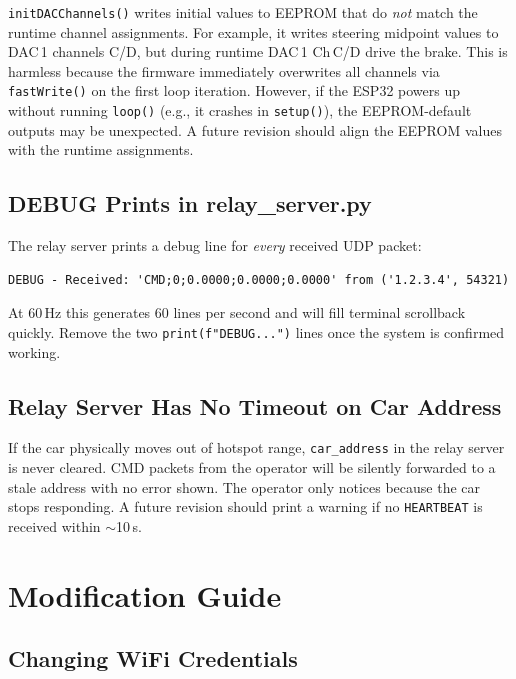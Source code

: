 \documentclass[12pt, letterpaper]{article}
\begin{document}
\texttt{initDACChannels()} writes initial values to EEPROM that do \emph{not}
match the runtime channel assignments.  For example, it writes steering midpoint
values to DAC\,1 channels C/D, but during runtime DAC\,1 Ch\,C/D drive the
brake.  This is harmless because the firmware immediately overwrites all channels
via \texttt{fastWrite()} on the first loop iteration.  However, if the ESP32
powers up without running \texttt{loop()} (e.g., it crashes in \texttt{setup()}),
the EEPROM-default outputs may be unexpected.  A future revision should align the
EEPROM values with the runtime assignments.

\subsection{DEBUG Prints in relay\_server.py}

The relay server prints a debug line for \emph{every} received UDP packet:

\begin{lstlisting}[style=terminal]
DEBUG - Received: 'CMD;0;0.0000;0.0000;0.0000' from ('1.2.3.4', 54321)
\end{lstlisting}

At 60\,Hz this generates 60 lines per second and will fill terminal scrollback
quickly.  Remove the two \texttt{print(f"DEBUG...")} lines once the system is
confirmed working.

\subsection{Relay Server Has No Timeout on Car Address}

If the car physically moves out of hotspot range, \texttt{car\_address} in the
relay server is never cleared.  CMD packets from the operator will be silently
forwarded to a stale address with no error shown.  The operator only notices
because the car stops responding.  A future revision should print a warning
if no \texttt{HEARTBEAT} is received within $\sim$10\,s.

\section{Modification Guide}

\subsection{Changing WiFi Credentials}
\end{document}
